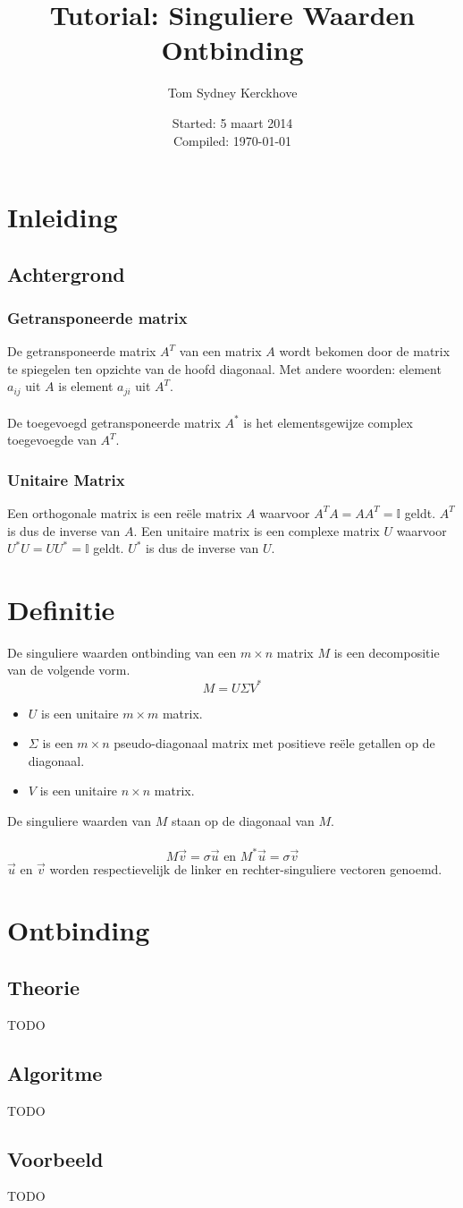\documentclass[10pt,a4paper]{article}
\author{Tom Sydney Kerckhove}
\title{Tutorial: Singuliere Waarden Ontbinding}
\date{Started: 5 maart 2014\\Compiled: \today}
\begin{document}
\maketitle
\tableofcontents
\pagebreak

\section{Inleiding}

\subsection{Achtergrond}
\subsubsection{Getransponeerde matrix}
De getransponeerde matrix $A^T$ van een matrix $A$ wordt bekomen door de matrix te spiegelen ten opzichte van de hoofd diagonaal.
Met andere woorden: element $a_{ij}$ uit $A$ is element $a_{ji}$ uit $A^T$.\\\\
De toegevoegd getransponeerde matrix $A^*$ is het elementsgewijze complex toegevoegde van $A^T$.

\subsubsection{Unitaire Matrix}
Een orthogonale matrix is een re\"ele matrix $A$ waarvoor $A^TA=AA^T=\mathbb{I}$ geldt. $A^T$ is dus de inverse van $A$.
Een unitaire matrix is een complexe matrix $U$ waarvoor $U^*U=UU^*=\mathbb{I}$ geldt. $U^*$ is dus de inverse van $U$.

\section{Definitie}
De singuliere waarden ontbinding van een $m\times n$ matrix $M$ is een decompositie van de volgende vorm.
\[
M = U \Sigma V^*
\]
\begin{itemize}
\item $U$ is een unitaire $m\times m$ matrix.
\item $\Sigma$ is een $m\times n$ pseudo-diagonaal matrix met positieve re\"ele getallen op de diagonaal.
\item $V$ is een unitaire $n\times n$ matrix.
\end{itemize}
De singuliere waarden van $M$ staan op de diagonaal van $M$.\\\\
\[
M\vec{v} = \sigma\vec{u} \text{ en } M^*\vec{u} = \sigma\vec{v}
\]
$\vec{u}$ en $\vec{v}$ worden respectievelijk de linker en rechter-singuliere vectoren genoemd.

\section{Ontbinding}
\subsection{Theorie}
TODO
\subsection{Algoritme}
TODO
\subsection{Voorbeeld}
TODO
\end{document}
